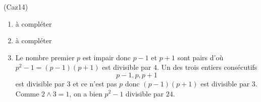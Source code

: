 \begin{tiny}(Caz14)\end{tiny}
\begin{enumerate}
  \item à compléter
  \item à compléter
  \item Le nombre premier $p$ est impair donc $p-1$ et $p+1$ sont pairs d'où $p^2-1=(p-1)(p+1)$ est divisible par $4$. Un des trois entiers consécutifs 
  \begin{displaymath}
    p-1, p , p+1
  \end{displaymath}
est divisible par $3$ et ce n'est pas $p$ donc $(p-1)(p+1)$ est divisible par $3$. Comme $2\wedge 3 =1$, on a bien $p^2-1$ divisible par $24$.
\end{enumerate}
